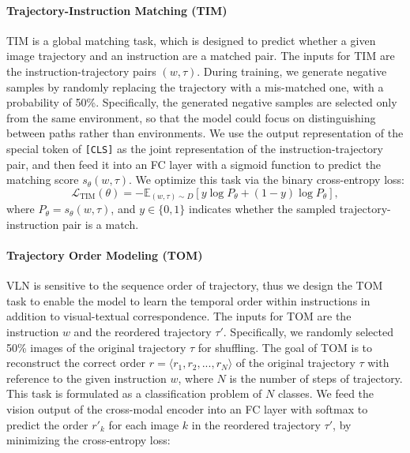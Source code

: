\documentclass[10pt,twocolumn,letterpaper]{article}
\begin{document}
\vspace{-8pt}
\paragraph{Trajectory-Instruction Matching (TIM)} TIM is a global matching task, which is designed to predict whether a given image trajectory and an instruction are a matched pair.
The inputs for TIM are the instruction-trajectory pairs $\left(w,\tau \right)$.
During training, we generate negative samples by randomly replacing the trajectory with a mis-matched one, with a probability of 50\%. 
Specifically, the generated negative samples are selected only from the same environment, so that the model could focus on distinguishing between paths rather than environments. We use the output representation of the special token of \texttt{[CLS]} as the joint representation of the instruction-trajectory pair, and then feed it into an FC layer with a sigmoid function to predict the matching score $s_\theta(w,\tau)$.
We optimize this task via the binary cross-entropy loss:
\begin{equation}
    \mathcal{L}_{\text{TIM}}(\theta) = - \mathbb{E}_{({w}, {\tau})\sim D} [y \log P_{\theta} + (1-y) \log P_{\theta}],
\end{equation}
where $P_{\theta} = s_{\theta}({w}, {\tau})$, and $y\in \{0, 1\}$ indicates whether the sampled trajectory-instruction pair is a match. 

\vspace{-8pt}
\paragraph{Trajectory Order Modeling (TOM)}
VLN is sensitive to the sequence order of trajectory,
thus we design the TOM task to enable the model to learn the temporal order within instructions in addition to visual-textual correspondence.
The inputs for TOM are the instruction $w$ and the reordered trajectory ${\tau}'$. 
Specifically, we randomly selected 50\% images of the original trajectory $\tau$ for shuffling. 
The goal of TOM is to reconstruct the correct order ${r}={\langle}{r_1, r_2, ..., r_N}{\rangle}$ of the original trajectory $\tau$ 
with reference to the given instruction $w$, where $N$ is the number of steps of trajectory.
This task is formulated as a classification problem of $N$ classes. We feed the vision output of the cross-modal encoder into an FC layer with softmax to predict the order $r'_{k}$ for each image $k$ in the reordered trajectory ${\tau}'$, by minimizing the cross-entropy loss:
\end{document}
